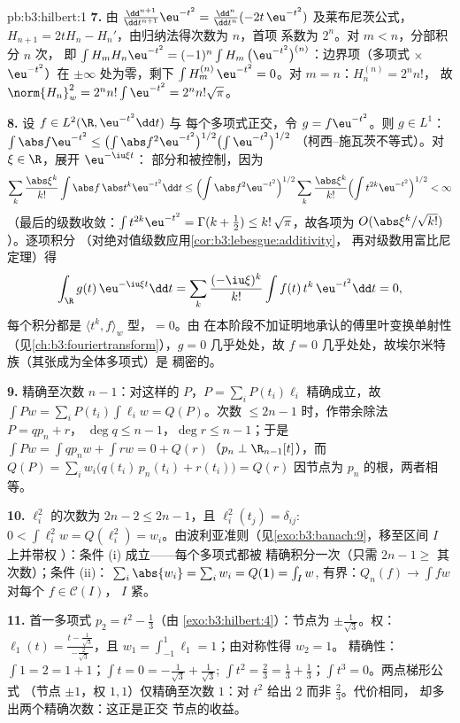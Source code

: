 \begin{solution}{pb:b3:hilbert:1}
\textbf{7.} 由 $\frac{\dd^{n+1}}{\dd t^{n+1}}\eu^{-t^2} =
\frac{\dd^n}{\dd t^n}(-2t\,\eu^{-t^2})$ 及莱布尼茨公式，$H_{n+1}
= 2tH_n - H_n'$，由归纳法得次数为 $n$，首项
系数为 $2^n$。对 $m < n$，分部积分 $n$ 次，
即 $\int H_m H_n\eu^{-t^2} = (-1)^n\int H_m\,\bigl(\eu^{-t^2}
\bigr)^{(n)}$：边界项（多项式 $\times$
$\eu^{-t^2}$）在 $\pm\infty$ 处为零，剩下 $\int
H_m^{(n)}\,\eu^{-t^2} = 0$。对 $m = n$：$H_n^{(n)} = 2^nn!$，
故 $\norm{H_n}_w^2 = 2^nn!\int\eu^{-t^2} = 2^nn!\sqrt\pi$。

\textbf{8.} 设 $f \in L^2(\R, \eu^{-t^2}\dd t)$ 与
每个多项式正交，令 $g = f\eu^{-t^2}$。则 $g \in
L^1$：$\int\abs f\eu^{-t^2} \leq \bigl(\int\abs
f^2\eu^{-t^2}\bigr)^{1/2}\bigl(\int\eu^{-t^2}\bigr)^{1/2}$
（柯西--施瓦茨不等式）。对 $\xi \in \R$，展开 $\eu^{-\iu\xi t}$：
部分和被控制，因为
\[
\sum_k\frac{\abs\xi^k}{k!}\int\abs f\,\abs t^k\eu^{-t^2}\dd t
\leq \Bigl(\int \abs f^2\eu^{-t^2}\Bigr)^{1/2}
\sum_k\frac{\abs\xi^k}{k!}\Bigl(\int
t^{2k}\eu^{-t^2}\Bigr)^{1/2} < \infty
\]
（最后的级数收敛：$\int t^{2k}\eu^{-t^2} =
\Gamma(k+\frac12) \leq k!\,\sqrt\pi$，故各项为
$O(\abs\xi^k/\sqrt{k!})$）。逐项积分
（对绝对值级数应用\cref{cor:b3:lebesgue:additivity}，
再对级数用富比尼定理）得
\[
\int_\R g(t)\,\eu^{-\iu\xi t}\dd t
= \sum_k\frac{(-\iu\xi)^k}{k!}\int f(t)\,t^k\,\eu^{-t^2}\dd t
= 0 ,
\]
每个积分都是 $\langle t^k, f\rangle_w$ 型，$= 0$。由
在本阶段不加证明地承认的傅里叶变换单射性
（见\cref{ch:b3:fouriertransform}），$g = 0$ 几乎处处，故 $f = 0$
几乎处处，故埃尔米特族（其张成为全体多项式）是
稠密的。

\textbf{9.} 精确至次数 $n - 1$：对这样的 $P$，$P =
\sum_iP(t_i)\ell_i$ 精确成立，故 $\int Pw = \sum_iP(t_i)\int
\ell_iw = Q(P)$。次数 $\leq 2n - 1$ 时，作带余除法 $P = qp_n + r$，
$\deg q \leq n - 1$，$\deg r \leq n-1$；于是 $\int Pw = \int
qp_nw + \int rw = 0 + Q(r)$（$p_n \perp \R_{n-1}[t]$），而
$Q(P) = \sum_iw_i\bigl(q(t_i)\,p_n(t_i) + r(t_i)\bigr) = Q(r)$
因节点为 $p_n$ 的根，两者相等。

\textbf{10.} $\ell_i^2$ 的次数为 $2n - 2 \leq 2n - 1$，且
$\ell_i^2(t_j) = \delta_{ij}$: $0 < \int\ell_i^2w = Q(\ell_i^2)
= w_i$。由波利亚准则（见\cref{exo:b3:banach:9}，移至区间 $I$ 上并带权
）：条件 (i) 成立——每个多项式都被
精确积分一次（只需 $2n - 1 \geq$ 其次数）；条件 (ii)：
$\sum_i\abs{w_{i}} = \sum_iw_i = Q(\mathbf 1) = \int_Iw$,
有界：$Q_n(f) \to \int fw$ 对每个 $f \in \mathcal C(I)$，
$I$ 紧。

\textbf{11.} 首一多项式 $p_2 = t^2 - \frac13$（由
\cref{exo:b3:hilbert:4}）：节点为 $\pm\frac1{\sqrt3}$。权：
$\ell_1(t) = \frac{t - \frac1{\sqrt3}}{-\frac2{\sqrt3}}$，且
$w_1 = \int_{-1}^1\ell_1 = 1$；由对称性得 $w_2 = 1$。
精确性：$\int 1 = 2 = 1 + 1$；$\int t = 0 =
-\frac1{\sqrt3} + \frac1{\sqrt3}$; $\int t^2 = \frac23 =
\frac13 + \frac13$；$\int t^3 = 0$。两点梯形公式
（节点 $\pm1$，权 $1, 1$）仅精确至次数
$1$：对 $t^2$ 给出 $2$ 而非 $\frac23$。代价相同，
却多出两个精确次数：这正是正交
节点的收益。


\end{solution}
